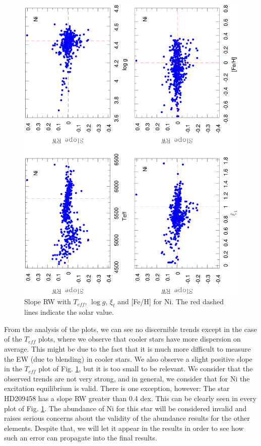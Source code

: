 \documentclass[dvips,12pt,a4paper]{report}
\begin{document}
{{\begin{figure}[h!]
\centering
\includegraphics[angle=-90, trim=8mm 0mm 5mm 10mm, clip,width=12 cm]{pics/parte3/RW.eps}
\caption[Slope RW with the stellar parameters for Ni]{Slope RW with $T_{eff}$, $\log g$, $\xi_t$ and [Fe/H] for Ni. The red dashed lines indicate the solar value.}
\label{slopeRW}
\end{figure}

From the analysis of the plots, we can see no discernible trends except in the case of the $T_{eff}$ plots, where we observe that cooler stars  have more dispersion on average. This might be due to the fact that it is much more difficult to measure the EW (due to blending) in cooler stars. We also observe a slight positive slope in the $T_{eff}$ plot of Fig. \ref{slopeRW}, but it is too small to be relevant. We consider that the observed trends are not very strong, and in general, we consider that for Ni the excitation equilibrium is valid. There is one exception, however: The star HD209458 has a slope RW greater than 0.4 dex. This can be clearly seen in every plot of Fig. \ref{slopeRW}. The abundance of Ni for this star will be considered invalid and raises serious concerns about the validity of the abundance results for the other elements. Despite that, we will let it appear in the results in order to see how such an error can propagate into the final results.





}}
\end{document}
